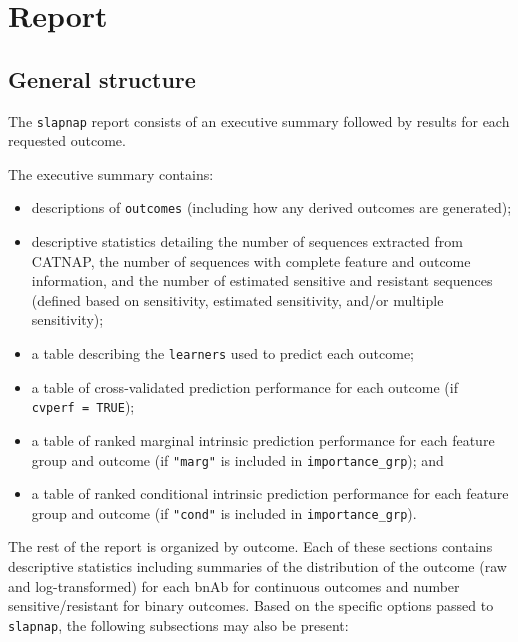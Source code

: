 \documentclass[]{article}
\providecommand{\tightlist}{%
  \setlength{\itemsep}{0pt}\setlength{\parskip}{0pt}}
\begin{document}
\section{Report}\label{sec:report}

\subsection{General structure}\label{general-structure}

The \texttt{slapnap} report consists of an executive summary followed by
results for each requested outcome.

The executive summary contains:

\begin{itemize}
\tightlist
\item
  descriptions of \texttt{outcomes} (including how any derived outcomes
  are generated);
\item
  descriptive statistics detailing the number of sequences extracted
  from CATNAP, the number of sequences with complete feature and outcome
  information, and the number of estimated sensitive and resistant
  sequences (defined based on sensitivity, estimated sensitivity, and/or
  multiple sensitivity);
\item
  a table describing the \texttt{learners} used to predict each outcome;
\item
  a table of cross-validated prediction performance for each outcome (if
  \texttt{cvperf\ =\ TRUE});
\item
  a table of ranked marginal intrinsic prediction performance for each
  feature group and outcome (if \texttt{"marg"} is included in
  \texttt{importance\_grp}); and
\item
  a table of ranked conditional intrinsic prediction performance for
  each feature group and outcome (if \texttt{"cond"} is included in
  \texttt{importance\_grp}).
\end{itemize}

The rest of the report is organized by outcome. Each of these sections
contains descriptive statistics including summaries of the distribution
of the outcome (raw and log-transformed) for each bnAb for continuous
outcomes and number sensitive/resistant for binary outcomes. Based on
the specific options passed to \texttt{slapnap}, the following
subsections may also be present:
\end{document}
